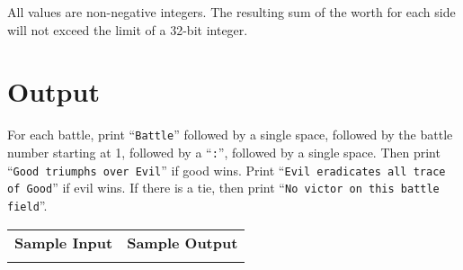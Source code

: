 \documentclass{article}
\begin{document}
All values are non-negative integers.  The resulting sum of the worth for each
side will not exceed the limit of a 32-bit integer.

\section{Output}

For each battle, print ``\verb+Battle+'' followed by a single space, followed by 
the battle number starting at 1, followed by a ``\verb+:+'', followed by a single
space.  Then print ``\verb+Good triumphs over Evil+'' if good wins.  Print 
``\verb+Evil eradicates all trace of Good+'' if evil wins.  If there is a tie,
then print
``\verb+No victor on this battle field+''.

\vskip 16pt
\noindent
\setlength{\extrarowheight}{4pt}
\begin{tabularx}{\textwidth}{ | p{5cm} | X | }
\hline
\textbf{Sample Input} & \textbf{Sample Output} \\

&

\\
\hline
\end{tabularx}
\end{document}

